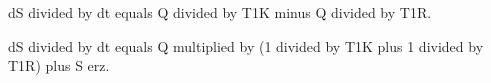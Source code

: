 dS divided by dt equals Q divided by T1K minus Q divided by T1R.  

dS divided by dt equals Q multiplied by (1 divided by T1K plus 1 divided by T1R) plus S erz.